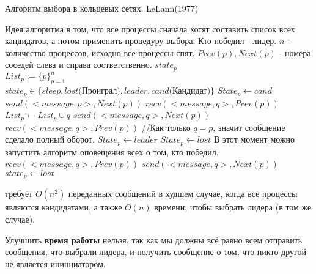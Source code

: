 \begin{algorithm}
\caption{Алгоритм выбора в кольцевых сетях. LeLann(1977)}
\label{algLeLann}
\begin{algorithmic}
\State Идея алгоритма в том, что все процессы сначала хотят составить список всех кандидатов, а потом применить процедуру выбора. Кто победил - лидер. 
\Require $n$ - количество процессов, исходно все процессы спят. $Prev(p), Next(p)$ - номера соседей слева и справа соответственно.
\Ensure $state_p$\\
$List_p:=\{p\}_{p=1}^n$ \\ 
$state_p \in \{sleep, lost\text{(Проиграл)}, leader, cand\text{(Кандидат)}\}$ 
 
    \State $State_p \gets cand$
    \State $send(<message, p>, Next(p))$ 
    \State $recv(<message, q>, Prev(p))$ 
     
        \State $List_p \gets List_p \cup {q}$
        \State $send(<message, q>, Next(p))$ 
        \State {}
        \State $recv(<message, q>, Prev(p))$ 
        \State //Как только $q = p$, значит сообщение сделало полный оборот.
    \EndWhile
     
        \State $State_p \gets leader$
    \Else 
        \State $State_p \gets lost$
    \EndIf
    \State В этот момент можно запустить алгоритм оповещения всех о том, кто победил.
\Else[Не инициаторы] 
        \State $recv(<message, q>, Prev(p))$ 
        \State $send(<message, q>, Next(p))$ 
            \State $state_p \gets lost$
        \EndIf
    \EndWhile
\EndIf 
\end{algorithmic}
\end{algorithm}
 требует $O(n^2)$ переданных сообщений в худшем случае, когда все процессы являются кандидатами, а также $O(n)$ времени, чтобы выбрать лидера (в том же случае).

Улучшить \textbf{время работы} нельзя, так как мы должны всё равно всем отправить сообщения, что выбрали лидера, и получить сообщение о том, что никто другой не является ининциатором.

